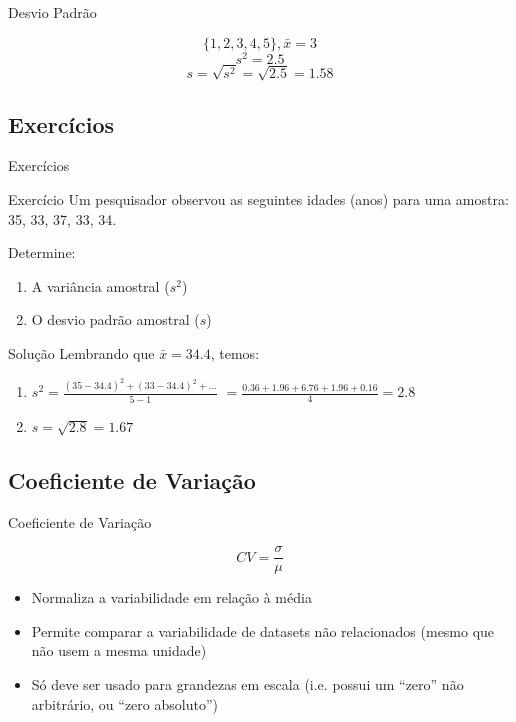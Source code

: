 \documentclass{beamer}
\begin{document}
\begin{frame}{Desvio Padrão}
  \begin{example}
      \begin{displaymath}
    \{1,2,3,4,5\}, \bar{x} = 3
  \end{displaymath}
      \begin{displaymath}
        s^2 = 2.5
      \end{displaymath}
    \begin{displaymath}
        s = \sqrt{s^2} = \sqrt{2.5} = 1.58
    \end{displaymath}
  \end{example}
\end{frame}

\subsection{Exercícios}
\begin{frame}{Exercícios}
  \begin{block}{Exercício}
    Um pesquisador observou as seguintes idades (anos) para uma amostra:
    35, 33, 37, 33, 34.
    
    Determine:
    \begin{enumerate}
    \item<1-> A variância amostral ($s^2$)
    \item<1-> O desvio padrão amostral ($s$)
    \end{enumerate}
  \end{block}
  
  \begin{block}{Solução}
    Lembrando que $\bar{x} = 34.4$, temos:
    \begin{enumerate}
    \item $s^2 =
      \frac{(35-34.4)^2+(33-34.4)^2+\ldots}{5-1}$
      $=\frac{0.36+1.96+6.76+1.96+0.16}{4}=2.8$
    \item $s = \sqrt{2.8} = 1.67 $
    \end{enumerate}
  \end{block}
\end{frame}

\subsection{Coeficiente de Variação}
\begin{frame}{Coeficiente de Variação}
  \begin{definition}
    $$CV = \frac{\sigma}{\mu}$$
  \end{definition}
  \begin{itemize}
  \item Normaliza a variabilidade em relação à média
  \item Permite comparar a variabilidade de datasets não relacionados
    (mesmo que não usem a mesma unidade)
  \item Só deve ser usado para grandezas em escala (i.e. possui um
    ``zero'' não arbitrário, ou ``zero absoluto'')
  \end{itemize}
\end{frame}
\end{document}
